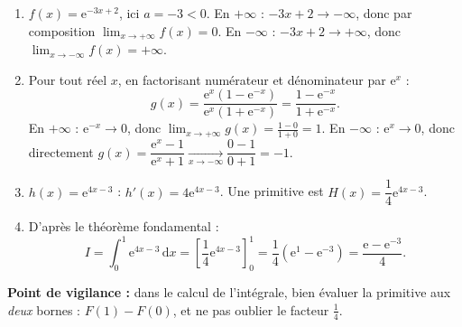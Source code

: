 \documentclass[11pt]{article}
\begin{document}
\begin{corrige}
\begin{enumerate}
\item $f(x)=\mathrm{e}^{-3x+2}$, ici $a=-3<0$.
En $+\infty$ : $-3x+2\to -\infty$, donc par composition $\displaystyle\lim_{x\to +\infty}f(x)=0$.
En $-\infty$ : $-3x+2\to +\infty$, donc $\displaystyle\lim_{x\to -\infty}f(x)=+\infty$.
\item Pour tout réel $x$, en factorisant numérateur et dénominateur par $\mathrm{e}^{x}$ :
\[g(x)=\frac{\mathrm{e}^{x}\left(1-\mathrm{e}^{-x}\right)}{\mathrm{e}^{x}\left(1+\mathrm{e}^{-x}\right)}=\frac{1-\mathrm{e}^{-x}}{1+\mathrm{e}^{-x}}.\]
En $+\infty$ : $\mathrm{e}^{-x}\to 0$, donc $\displaystyle\lim_{x\to +\infty}g(x)=\frac{1-0}{1+0}=1$.
En $-\infty$ : $\mathrm{e}^{x}\to 0$, donc directement $g(x)=\dfrac{\mathrm{e}^{x}-1}{\mathrm{e}^{x}+1}\xrightarrow[x\to -\infty]{}\dfrac{0-1}{0+1}=-1$.
\item $h(x)=\mathrm{e}^{4x-3}$ : $h'(x)=4\mathrm{e}^{4x-3}$. Une primitive est $H(x)=\dfrac{1}{4}\mathrm{e}^{4x-3}$.
\item D'après le théorème fondamental :
\[I=\int_{0}^{1}\mathrm{e}^{4x-3}\,\mathrm{d}x=\left[\frac{1}{4}\mathrm{e}^{4x-3}\right]_{0}^{1}=\frac{1}{4}\left(\mathrm{e}^{1}-\mathrm{e}^{-3}\right)=\frac{\mathrm{e}-\mathrm{e}^{-3}}{4}.\]
\end{enumerate}
\textbf{Point de vigilance :} dans le calcul de l'intégrale, bien évaluer la primitive aux \emph{deux} bornes : $F(1)-F(0)$, et ne pas oublier le facteur $\frac{1}{4}$.
\end{corrige}
\end{document}
